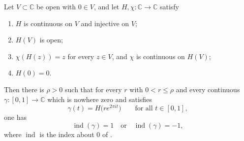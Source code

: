\begin{theorem}
Let $V\subset\mathbb{C}$ be open with $0\in V$, and let
$H,\chi\colon\mathbb{C}\to\mathbb{C}$ satisfy
\begin{enumerate}
\item[(i)] $H$ is continuous on $V$ and injective on $V$;
\item[(ii)] $H(V)$ is open;
\item[(iii)] $\chi(H(z))=z$ for every $z\in V$, and $\chi$ is continuous on
$H(V)$;
\item[(iv)] $H(0)=0$.
\end{enumerate}
Then there is $\rho>0$ such that for every $r$ with $0<r\le\rho$ and every
continuous $\gamma\colon[0,1]\to\mathbb{C}$ which is nowhere zero and satisfies
\[
  \gamma(t)=H\bigl(re^{2\pi it}\bigr)\qquad\text{for all }t\in[0,1],
\]
one has
\[
  \operatorname{ind}(\gamma)=1\quad\text{or}\quad\operatorname{ind}(\gamma)=-1,
\]
where $\operatorname{ind}$ is the index about $0$ of .
\end{theorem}
